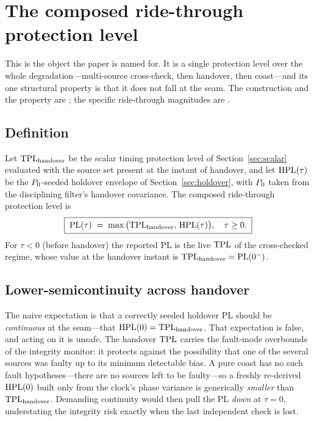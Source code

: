 \section{The composed ride-through protection level}
\label{sec:composition}

This is the object the paper is named for. It is a single protection level over
the whole degradation---multi-source cross-check, then handover, then coast---and
its one structural property is that it does not fall at the seam. The construction
and the property are \Proven{}; the specific ride-through magnitudes are
\Modelled{}.

\subsection{Definition}
\label{sec:compdef}

Let $\mathrm{TPL}_{\mathrm{handover}}$ be the scalar timing protection level of
Section~\ref{sec:scalar} evaluated with the source set present at the instant of
handover, and let $\mathrm{HPL}(\tau)$ be the $P_0$-seeded holdover envelope of
Section~\ref{sec:holdover}, with $P_0$ taken from the disciplining filter's
handover covariance. The composed ride-through protection level is
\begin{equation}
  \boxed{\;\mathrm{PL}(\tau)\;=\;\max\big(\mathrm{TPL}_{\mathrm{handover}},\,\mathrm{HPL}(\tau)\big),\quad \tau\ge0.\;}
  \label{eq:composed}
\end{equation}
For $\tau<0$ (before handover) the reported PL is the live $\mathrm{TPL}$ of the
cross-checked regime, whose value at the handover instant is
$\mathrm{TPL}_{\mathrm{handover}}=\mathrm{PL}(0^{-})$.

\subsection{Lower-semicontinuity across handover}
\label{sec:lsc}

The naive expectation is that a correctly seeded holdover PL should be
\emph{continuous} at the seam---that $\mathrm{HPL}(0)=\mathrm{TPL}_{\mathrm{handover}}$. That
expectation is false, and acting on it is unsafe. The handover $\mathrm{TPL}$ carries the
fault-mode overbounds of the integrity monitor: it protects against the
possibility that one of the several sources was faulty up to its minimum detectable
bias. A pure coast has no such fault hypotheses---there are no sources left to be
faulty---so a freshly re-derived $\mathrm{HPL}(0)$ built only from the clock's phase
variance is generically \emph{smaller} than $\mathrm{TPL}_{\mathrm{handover}}$. Demanding
continuity would then pull the PL \emph{down} at $\tau=0$, understating the
integrity risk exactly when the last independent check is lost.

